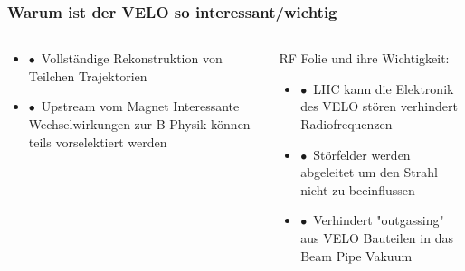 \documentclass[aspectratio=1610, 12pt, xcolor=dvipsnames]{beamer}
\begin{document}
\begin{frame}\frametitle{Warum ist der VELO so interessant/wichtig}
  \begin{columns}
    \begin{column}[c]{0.48\textwidth}
      \begin{itemize}
        \item $\bullet$\, Vollständige Rekonstruktion von Teilchen Trajektorien
        \item $\bullet$\, Upstream vom Magnet \to Interessante Wechselwirkungen zur B-Physik können teils vorselektiert werden
      \end{itemize}
    \end{column}
    \begin{column}[c]{0.48\textwidth}
      RF Folie und ihre Wichtigkeit:
      \begin{itemize}
        \item $\bullet$\, LHC kann die Elektronik des VELO stören \to verhindert Radiofrequenzen
        \item $\bullet$\, Störfelder werden abgeleitet um den Strahl nicht zu beeinflussen
        \item $\bullet$\, Verhindert "outgassing" aus VELO Bauteilen in das Beam Pipe Vakuum
      \end{itemize}
    \end{column}
  \end{columns}
\end{frame}
\end{document}
